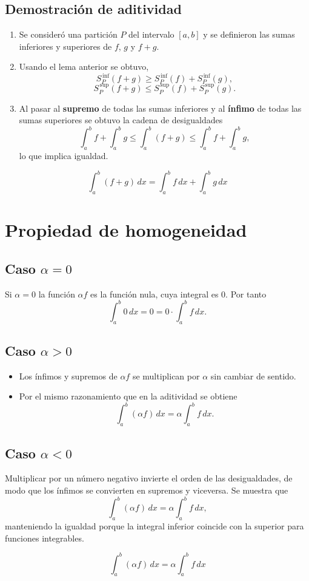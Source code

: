 \documentclass[12pt,a4paper]{article}
\begin{document}
\subsection{Demostración de aditividad}
\begin{enumerate}
  \item Se consideró una partición $P$ del intervalo $[a,b]$ y se definieron las sumas inferiores y superiores de $f$, $g$ y $f+g$.
  \item Usando el lema anterior se obtuvo,
  \[
  S_{P}^{\,\inf}(f+g) \ge S_{P}^{\,\inf}(f) + S_{P}^{\,\inf}(g),
  \]
  \[
  S_{P}^{\,\sup}(f+g) \le S_{P}^{\,\sup}(f) + S_{P}^{\,\sup}(g).
  \]
  \item Al pasar al \textbf{supremo} de todas las sumas inferiores y al \textbf{ínfimo} de todas las sumas superiores se obtuvo la cadena de desigualdades
  \[
  \int_{a}^{b} f + \int_{a}^{b} g \le \int_{a}^{b} (f+g) \le \int_{a}^{b} f + \int_{a}^{b} g,
  \]
  lo que implica igualdad.
\end{enumerate}
\begin{keybox}
\[\boxed{\int_{a}^{b} (f+g)\,dx = \int_{a}^{b} f\,dx + \int_{a}^{b} g\,dx}\]
\end{keybox}

\section{Propiedad de homogeneidad}

\subsection{Caso $\alpha = 0$}
Si $\alpha = 0$ la función $\alpha f$ es la función nula, cuya integral es 0. Por tanto
\[
\int_{a}^{b} 0\,dx = 0 = 0\cdot \int_{a}^{b} f\,dx.
\]

\subsection{Caso $\alpha > 0$}
\begin{itemize}
  \item Los ínfimos y supremos de $\alpha f$ se multiplican por $\alpha$ sin cambiar de sentido.
  \item Por el mismo razonamiento que en la aditividad se obtiene
  \[
  \int_{a}^{b} (\alpha f)\,dx = \alpha\int_{a}^{b} f\,dx.
  \]
\end{itemize}

\subsection{Caso $\alpha < 0$}
Multiplicar por un número negativo invierte el orden de las desigualdades, de modo que los ínfimos se convierten en supremos y viceversa. Se muestra que
\[
\int_{a}^{b} (\alpha f)\,dx = \alpha\int_{a}^{b} f\,dx,
\]
manteniendo la igualdad porque la integral inferior coincide con la superior para funciones integrables.
\begin{keybox}
\[\boxed{\int_{a}^{b} (\alpha f)\,dx = \alpha\int_{a}^{b} f\,dx}\]
\end{keybox}
\end{document}
